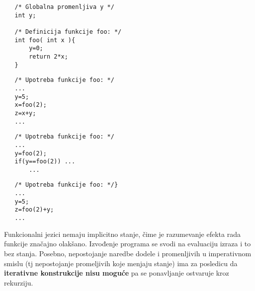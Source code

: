 \documentclass[../main.tex]{subfiles}
\begin{document}
	   \begin{multicols}{2}
	   
	   \begin{boxprimer}
	   \begin{Verbatim}
   /* Globalna promenljiva y */
   int y;
	   
   /* Definicija funkcije foo: */
   int foo( int x ){	
	   y=0;
	   return 2*x;
   }
	   \end{Verbatim}
	   \end{boxprimer}
	   
	   \begin{boxprimer}
	   \begin{Verbatim}
   /* Upotreba funkcije foo: */
   ...
   y=5;
   x=foo(2);
   z=x+y;
   ...
	   \end{Verbatim}
	   \end{boxprimer}
	   
	   \columnbreak
	   
	   \begin{boxprimer}
	   \begin{Verbatim}
   /* Upotreba funkcije foo: */
   ...
   y=foo(2);
   if(y==foo(2)) ...
	   ...
		   \end{Verbatim}
		   \end{boxprimer}
		   
		   
		   \begin{boxprimer}
		   \begin{Verbatim}
   /* Upotreba funkcije foo: */}
   ...
   y=5;
   z=foo(2)+y;
   ...
	   \end{Verbatim}
	   \end{boxprimer}
	   
	   \end{multicols}
	   Funkcionalni jezici nemaju implicitno stanje, čime je razumevanje efekta rada funkcije značajno olakšano. Izvođenje programa se svodi na evaluaciju izraza i to bez stanja. Posebno, nepostojanje naredbe dodele i promenljivih u imperativnom smislu (tj nepostojanje promeljivih koje menjaju stanje) ima za posledicu da {\bf iterativne konstrukcije nisu moguće} pa se ponavljanje ostvaruje kroz rekurziju.
	   
\end{document}
